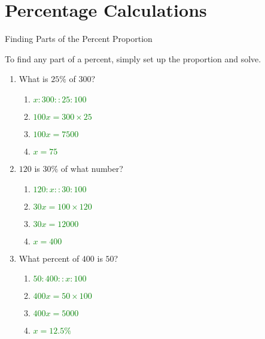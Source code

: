 \documentclass[]{beamer}
\begin{document}
\section{Percentage Calculations}
\begin{frame}{Finding Parts of the Percent Proportion}

To find any part of a percent, simply set up the proportion and solve.
\begin{enumerate}[<+->]
    \item What is $25\%$ of $300$?
        \begin{enumerate}
            \item \textcolor{green}{$ x:300 :: 25:100$}
            \item \textcolor{green}{$100x = 300 \times 25$}
            \item \textcolor{green}{$100x = 7500$}
            \item \textcolor{green}{$x = 75$}
        \end{enumerate}
    \item $120$ is $30\%$ of what number?
        \begin{enumerate}
            \item \textcolor{green}{$120:x :: 30 : 100 $}
            \item \textcolor{green}{$30x = 100 \times 120 $}
            \item \textcolor{green}{$30x = 12000 $}
            \item \textcolor{green}{$ x = 400 $}
        \end{enumerate}
    \item What percent of $400$ is $50$?
        \begin{enumerate}
            \item \textcolor{green}{$50 : 400 :: x : 100$}
            \item \textcolor{green}{$400x = 50 \times 100 $}
            \item \textcolor{green}{$400x = 5000 $}
            \item \textcolor{green}{$x=12.5\%$}
        \end{enumerate}
\end{enumerate}
\end{frame}
\end{document}
